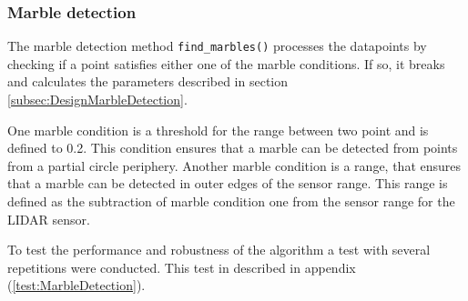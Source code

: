 \documentclass[../Head/Main.tex]{subfiles}
\begin{document}
\subsubsection{Marble detection}
\label{subsubsec:Implementation_marble}
The marble detection method \texttt{find\_marbles()} processes the datapoints by checking if a point satisfies either one of the marble conditions. If so, it breaks and calculates the parameters described in section \ref{subsec:DesignMarbleDetection}.\par 
One marble condition is a threshold for the range between two point and is defined to 0.2. This condition ensures that a marble can be detected from points from a partial circle periphery. Another marble condition is a range, that ensures that a marble can be detected in outer edges of the sensor range. This range is defined as the subtraction of marble condition one from the sensor range for the LIDAR sensor.

\clearpage
To test the performance and robustness of the algorithm a  test with several repetitions were conducted. This test in described in appendix (\ref{test:MarbleDetection}).
\end{document}
